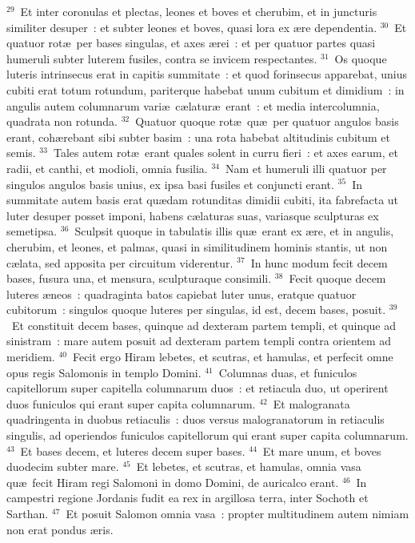 ${}^{29}$~Et inter coronulas et plectas, leones et boves et cherubim, et in juncturis similiter desuper~: et subter leones et boves, quasi lora ex \ae re dependentia.
${}^{30}$~Et quatuor rot\ae\ per bases singulas, et axes \ae rei~: et per quatuor partes quasi humeruli subter luterem fusiles, contra se invicem respectantes.
${}^{31}$~Os quoque luteris intrinsecus erat in capitis summitate~: et quod forinsecus apparebat, unius cubiti erat totum rotundum, pariterque habebat unum cubitum et dimidium~: in angulis autem columnarum vari\ae\ c\ae latur\ae\ erant~: et media intercolumnia, quadrata non rotunda.
${}^{32}$~Quatuor quoque rot\ae\ qu\ae\ per quatuor angulos basis erant, coh\ae rebant sibi subter basim~: una rota habebat altitudinis cubitum et semis.
${}^{33}$~Tales autem rot\ae\ erant quales solent in curru fieri~: et axes earum, et radii, et canthi, et modioli, omnia fusilia.
${}^{34}$~Nam et humeruli illi quatuor per singulos angulos basis unius, ex ipsa basi fusiles et conjuncti erant.
${}^{35}$~In summitate autem basis erat qu\ae dam rotunditas dimidii cubiti, ita fabrefacta ut luter desuper posset imponi, habens c\ae laturas suas, variasque sculpturas ex semetipsa.
${}^{36}$~Sculpsit quoque in tabulatis illis qu\ae\ erant ex \ae re, et in angulis, cherubim, et leones, et palmas, quasi in similitudinem hominis stantis, ut non c\ae lata, sed apposita per circuitum viderentur.
${}^{37}$~In hunc modum fecit decem bases, fusura una, et mensura, sculpturaque consimili.
${}^{38}$~Fecit quoque decem luteres \ae neos~: quadraginta batos capiebat luter unus, eratque quatuor cubitorum~: singulos quoque luteres per singulas, id est, decem bases, posuit.
${}^{39}$~Et constituit decem bases, quinque ad dexteram partem templi, et quinque ad sinistram~: mare autem posuit ad dexteram partem templi contra orientem ad meridiem.
${}^{40}$~Fecit ergo Hiram lebetes, et scutras, et hamulas, et perfecit omne opus regis Salomonis in templo Domini.
${}^{41}$~Columnas duas, et funiculos capitellorum super capitella columnarum duos~: et retiacula duo, ut operirent duos funiculos qui erant super capita columnarum.
${}^{42}$~Et malogranata quadringenta in duobus retiaculis~: duos versus malogranatorum in retiaculis singulis, ad operiendos funiculos capitellorum qui erant super capita columnarum.
${}^{43}$~Et bases decem, et luteres decem super bases.
${}^{44}$~Et mare unum, et boves duodecim subter mare.
${}^{45}$~Et lebetes, et scutras, et hamulas, omnia vasa qu\ae\ fecit Hiram regi Salomoni in domo Domini, de auricalco erant.
${}^{46}$~In campestri regione Jordanis fudit ea rex in argillosa terra, inter Sochoth et Sarthan.
${}^{47}$~Et posuit Salomon omnia vasa~: propter multitudinem autem nimiam non erat pondus \ae ris.


